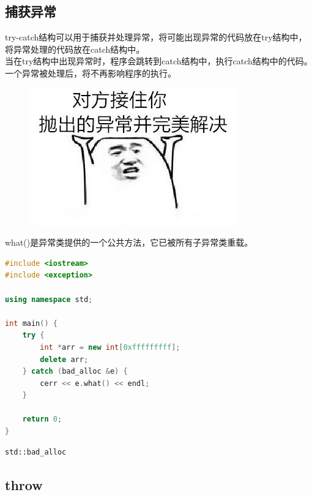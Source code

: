 \subsection{捕获异常}

try-catch结构可以用于捕获并处理异常，将可能出现异常的代码放在try结构中，将异常处理的代码放在catch结构中。\\

当在try结构中出现异常时，程序会跳转到catch结构中，执行catch结构中的代码。一个异常被处理后，将不再影响程序的执行。\\

\begin{figure}[H]
    \centering
    \includegraphics{img/Chapter11/11-1/1.png}
\end{figure}

what()是异常类提供的一个公共方法，它已被所有子异常类重载。\\


\begin{lstlisting}[language=C++]
#include <iostream>
#include <exception>

using namespace std;

int main() {
    try {
        int *arr = new int[0xfffffffff];
        delete arr;
    } catch (bad_alloc &e) {
        cerr << e.what() << endl;
    }

    return 0;
}
\end{lstlisting}

\begin{tcolorbox}
    \begin{verbatim}
std::bad_alloc
	\end{verbatim}
\end{tcolorbox}

\vspace{0.5cm}

\subsection{throw}


